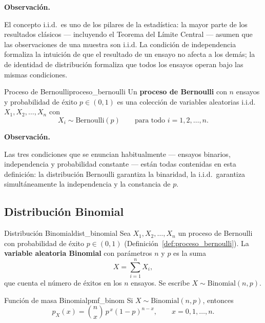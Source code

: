 \documentclass[12pt, a4paper]{book}
\newenvironment{observacion}{%
    \par\medskip\noindent\textbf{\color{azul}Observaci\'{o}n.}\enspace\itshape
}{\par\medskip}
\numberwithin{equation}{chapter}
\begin{document}
\begin{observacion}
	El concepto i.i.d.\ es uno de los pilares de la estadística: la
	mayor parte de los resultados clásicos --- incluyendo el Teorema del
	Límite Central --- asumen que las observaciones de una muestra son
	i.i.d. La condición de independencia formaliza la intuición de que
	el resultado de un ensayo no afecta a los demás; la de identidad de
	distribución formaliza que todos los ensayos operan bajo las mismas
	condiciones.
\end{observacion}

\begin{definicion}{Proceso de Bernoulli}{proceso_bernoulli}
	Un \textbf{proceso de Bernoulli} con $n$ ensayos y probabilidad de
	éxito $p \in (0,1)$ es una colección de variables aleatorias
	i.i.d.\ $X_1, X_2, \ldots, X_n$ con
	\[
	X_i \sim \mathrm{Bernoulli}(p) \qquad \text{para todo }
	i = 1, 2, \ldots, n.
	\]
\end{definicion}

\begin{observacion}
	Las tres condiciones que se enuncian habitualmente --- ensayos
	binarios, independencia y probabilidad constante --- están todas
	contenidas en esta definición: la distribución Bernoulli garantiza
	la binaridad, la i.i.d.\ garantiza simultáneamente la independencia
	y la constancia de $p$.
\end{observacion}

\subsection{Distribuci\'{o}n Binomial}

\begin{definicion}{Distribuci\'{o}n Binomial}{dist_binomial}
	Sea $X_1, X_2, \ldots, X_n$ un proceso de Bernoulli con probabilidad
	de éxito $p \in (0,1)$ (Definición~\ref{def:proceso_bernoulli}).
	La \textbf{variable aleatoria Binomial} con parámetros $n$ y $p$ es
	la suma
	\[
	X = \sum_{i=1}^{n} X_i,
	\]
	que cuenta el número de éxitos en los $n$ ensayos. Se escribe
	$X \sim \mathrm{Binomial}(n,p)$.
\end{definicion}

\begin{proposicion}{Funci\'{o}n de masa Binomial}{pmf_binom}
	Si $X \sim \mathrm{Binomial}(n,p)$, entonces
	\[
	p_X(x) = \binom{n}{x}\, p^{\,x}(1-p)^{n-x},
	\qquad x = 0, 1, \ldots, n.
	\]
\end{proposicion}
\end{document}
